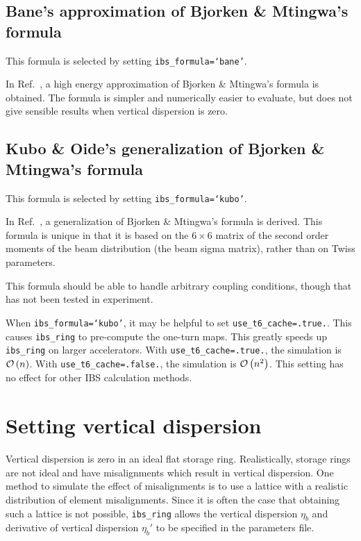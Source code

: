 \documentclass[11pt]{article}
\begin{document}
\subsection{Bane's approximation of Bjorken \& Mtingwa's formula}
This formula is selected by setting {\tt ibs_formula=`bane'}.

In Ref.~\cite{b:bane-approx}, a high energy approximation of Bjorken \& Mtingwa's formula
is obtained.  The formula is simpler and numerically easier to evaluate, but does
not give sensible results when vertical dispersion is zero.

\subsection{Kubo \& Oide's generalization of Bjorken \& Mtingwa's formula}
This formula is selected by setting {\tt ibs_formula=`kubo'}.

In Ref.~\cite{b:kubo}, a generalization of Bjorken \& Mtingwa's formula
is derived.  This formula is unique in that it is based on the $6\times6$
matrix of the second order moments of the beam distribution (the beam sigma matrix),
rather than on Twiss parameters.

This formula should be able to handle arbitrary coupling conditions, though
that has not been tested in experiment.

When {\tt ibs_formula=`kubo'}, it may be helpful to set {\tt use_t6_cache=.true.}.
This causes {\tt ibs_ring} to pre-compute the one-turn maps.  This greatly speeds up
{\tt ibs_ring} on larger accelerators.  With {\tt use_t6_cache=.true.}, the simulation
is ${\cal O}\left(n\right)$.  With {\tt use_t6_cache=.false.}, the simulation
is ${\cal O}\left(n^2\right)$.  This setting has no effect for other IBS calculation methods.

\section{Setting vertical dispersion}
Vertical dispersion is zero in an ideal flat storage ring.  Realistically, storage rings are not
ideal and have misalignments which result in vertical dispersion.  One method to simulate the effect
of misalignments is to use a lattice with a realistic distribution of element misalignments.
Since it is often the case that obtaining such a lattice is not possible, {\tt ibs_ring}
allows the vertical dispersion $\eta_b$ and derivative of vertical dispersion $\eta_b'$ to be
specified in the parameters file.
\end{document}
